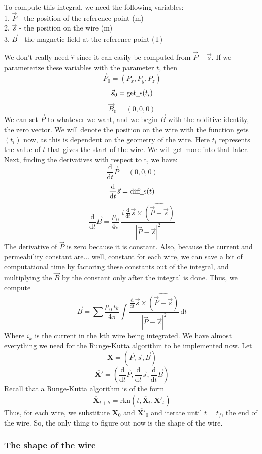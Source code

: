 \documentclass[12pt]{article}
\newcommand{\bfvec}[1]{\overline{\mathbf{#1}}}
\newcommand{\spaces}{\phantom{\qquad}}
\newcommand{\under}{\underline{\phantom{\enspace}}}
\newcommand{\diff}{\frac{\mathrm{d}}{\mathrm{d}t}}
\newcommand{\dif}{\mathrm{d}}
\begin{document}
	To compute this integral, we need the following variables: \\
		\spaces 1. $\vec{P}$ - the position of the reference point (m)\\
		\spaces 2. $\vec{s}$ - the position on the wire (m)\\
		\spaces 3. $\vec{B}$ - the magnetic field at the reference point (T)
		
	We don't really need $\hat{r}$ since it can easily be computed from $\vec{P} - \vec{s}$. If we parameterize these variables with the parameter $t$, then
			$$\vec{P}_0 = (P_x, P_y, P_z)$$
			$$\vec{s}_0 = \text{get\under s}(t_i)$$
			$$\vec{B}_0 = (0, 0, 0)$$
	We can set $\vec{P}$ to whatever we want, and we begin $\vec{B}$ with the additive identity, the zero vector. We will denote the position on the wire with the function get\under s$(t_i)$ now, as this is dependent on the geometry of the wire. Here $t_i$ represents the value of $t$ that gives the start of the wire. We will get more into that later. Next, finding the derivatives with respect to t, we have:
			$$\diff \vec{P} = (0, 0, 0)$$
			$$\diff \vec{s} = \text{diff\under s}(t)$$
			$$\diff \vec{B} = \frac{\mu_0}{4\pi} \, \frac{i\,\diff \vec{s} \times \widehat{(\vec{P} - \vec{s})}}{|\vec{P} - \vec{s}|^2}$$	
	The derivative of $\vec{P}$ is zero because it is constant. Also, because the current and permeability constant are... well, constant for each wire, we can save a bit of computational time by factoring these constants out of the integral, and multiplying the $\vec{B}$ by the constant only after the integral is done. Thus, we compute
			$$\vec{B} = \sum \frac{\mu_0 \, i_k}{4\pi}\int\frac{\diff \vec{s} \times \widehat{(\vec{P} - \vec{s})}}{|\vec{P} - \vec{s}|^2} \, \dif t$$	
	Where $i_k$ is the current in the kth wire being integrated. We have almost everything we need for the Runge-Kutta algorithm to be implemented now. Let
			$$\bfvec{X} = (\vec{P},\vec{s},\vec{B})$$
			$$\bfvec{X'} = \left(\diff\vec{P},\diff\vec{s},\diff\vec{B}\right)$$
	Recall that a Runge-Kutta algorithm is of the form
			$$\bfvec{X}_{t+h} = \mathrm{rkn}(t,\bfvec{X}_t,\bfvec{X'}_t)$$
	Thus, for each wire, we substitute $\bfvec{X}_0$ and $\bfvec{X'}_0$ and iterate until $t = t_f$, the end of the wire. So, the only thing to figure out now is the shape of the wire. 
	
	\subsubsection*{The shape of the wire}
		
\end{document}

